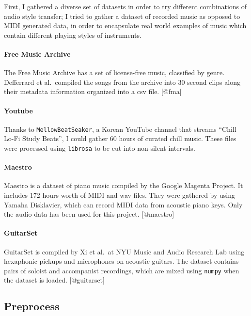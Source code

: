 \documentclass[12pt,a4paper,]{report}
\begin{document}
First, I gathered a diverse set of datasets in order to try different
combinations of audio style transfer; I tried to gather a dataset of
recorded music as opposed to MIDI generated data, in order to
encapsulate real world examples of music which contain different playing
styles of instruments.

\paragraph{Free Music Archive}

The Free Music Archive has a set of license-free music, classified by
genre. Defferrard et al.~compiled the songs from the archive into 30
second clips along their metadata information organized into a csv file.
{[}@fma{]}

\paragraph{Youtube}

Thanks to \texttt{MellowBeatSeaker}, a Korean YouTube channel that
streams ``Chill Lo-Fi Study Beats'', I could gather 60 hours of curated
chill music. These files were processed using \texttt{librosa} to be cut
into non-silent intervals.

\paragraph{Maestro}

Maestro is a dataset of piano music compiled by the Google Magenta
Project. It includes 172 hours worth of MIDI and wav files. They were
gathered by using Yamaha Disklavier, which can record MIDI data from
acoustic piano keys. Only the audio data has been used for this project.
{[}@maestro{]}

\paragraph{GuitarSet}

GuitarSet is compiled by Xi et al.~at NYU Music and Audio Research Lab
using hexaphonic pickups and microphones on acoustic guitars. The
dataset contains pairs of soloist and accompanist recordings, which are
mixed using \texttt{numpy} when the dataset is loaded. {[}@guitarset{]}

\hypertarget{preprocess}{%
\subsection{Preprocess}\label{preprocess}}
\end{document}
